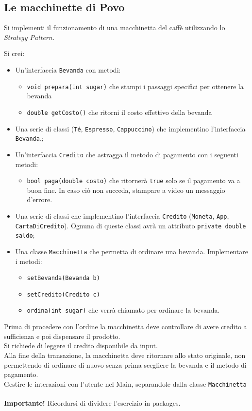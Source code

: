 \documentclass{article}
\begin{document}
\subsection{Le macchinette di Povo}

Si implementi il funzionamento di una macchinetta del caffè utilizzando lo \textit{Strategy Pattern.}

Si crei:
\begin{itemize}
    \item Un'interfaccia \texttt{Bevanda} con metodi:
    \begin{itemize}
        \item \texttt{void prepara(int sugar)} che stampi i passaggi specifici per ottenere la bevanda
        \item \texttt{double getCosto()} che ritorni il costo effettivo della bevanda
    \end{itemize}
    \item Una serie di classi (\texttt{Té}, \texttt{Espresso}, \texttt{Cappuccino}) che implementino l'interfaccia \texttt{Bevanda}.;
    \item Un'interfaccia \texttt{Credito} che astragga il metodo di pagamento con i seguenti metodi:
    \begin{itemize}
        \item \texttt{bool paga(double costo)} che ritornerà \texttt{true} solo se il pagamento va a buon fine. In caso ciò non succeda, stampare a video un messaggio d'errore.
    \end{itemize}
    \item Una serie di classi che implementino l'interfaccia \texttt{Credito} (\texttt{Moneta}, \texttt{App}, \texttt{CartaDiCredito}). Ognuna di queste classi avrà un attributo \texttt{private double saldo};
    \item Una classe \texttt{Macchinetta} che permetta di ordinare una bevanda. Implementare i metodi:
    \begin{itemize}
        \item \texttt{setBevanda(Bevanda b)}
        \item \texttt{setCredito(Credito c)}
        \item \texttt{ordina(int sugar)} che verrà chiamato per ordinare la bevanda.
    \end{itemize}
\end{itemize}
Prima di procedere con l'ordine la macchinetta deve controllare di avere credito a sufficienza e poi dispensare il prodotto. \\
Si richiede di leggere il credito disponibile da input. \\
Alla fine della transazione, la macchinetta deve ritornare allo stato originale, non permettendo di ordinare di nuovo senza prima scegliere la bevanda e il metodo di pagamento. \\
Gestire le interazioni con l'utente nel Main, separandole dalla classe \texttt{Macchinetta} \\
\\
\textbf{Importante!} Ricordarsi di dividere l'esercizio in packages.
\end{document}
